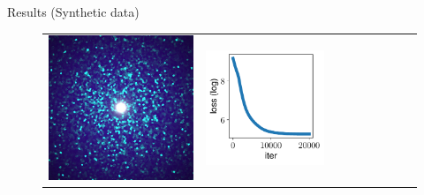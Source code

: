\documentclass[final]{beamer}
\newlength{\twocolwid}
\newlength{\resultwidth}
\begin{document}
\begin{frame}[t]
\begin{columns}[t]
\begin{column}{\twocolwid}
\begin{block}{Results (Synthetic data)}
\begin{figure}[t]
\begin{tabular}{ccrclcccc}
            		\includegraphics[width=\resultwidth]{images/synth/flake/target.jpg} &
            		\includegraphics[width=\resultwidth]{images/synth/flake/loss.pdf} &

\end{tabular}
\end{figure}
\end{block}
\end{column}
\end{columns}
\end{frame}
\end{document}
